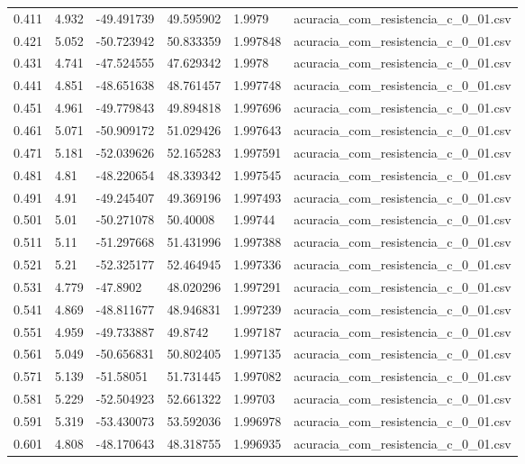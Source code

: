 \begin{table}
\begin{tabular}{llllll}
0.411 & 4.932 & -49.491739 & 49.595902 & 1.9979 & acuracia\_com\_resistencia\_c\_0\_01.csv \\
0.421 & 5.052 & -50.723942 & 50.833359 & 1.997848 & acuracia\_com\_resistencia\_c\_0\_01.csv \\
0.431 & 4.741 & -47.524555 & 47.629342 & 1.9978 & acuracia\_com\_resistencia\_c\_0\_01.csv \\
0.441 & 4.851 & -48.651638 & 48.761457 & 1.997748 & acuracia\_com\_resistencia\_c\_0\_01.csv \\
0.451 & 4.961 & -49.779843 & 49.894818 & 1.997696 & acuracia\_com\_resistencia\_c\_0\_01.csv \\
0.461 & 5.071 & -50.909172 & 51.029426 & 1.997643 & acuracia\_com\_resistencia\_c\_0\_01.csv \\
0.471 & 5.181 & -52.039626 & 52.165283 & 1.997591 & acuracia\_com\_resistencia\_c\_0\_01.csv \\
0.481 & 4.81 & -48.220654 & 48.339342 & 1.997545 & acuracia\_com\_resistencia\_c\_0\_01.csv \\
0.491 & 4.91 & -49.245407 & 49.369196 & 1.997493 & acuracia\_com\_resistencia\_c\_0\_01.csv \\
0.501 & 5.01 & -50.271078 & 50.40008 & 1.99744 & acuracia\_com\_resistencia\_c\_0\_01.csv \\
0.511 & 5.11 & -51.297668 & 51.431996 & 1.997388 & acuracia\_com\_resistencia\_c\_0\_01.csv \\
0.521 & 5.21 & -52.325177 & 52.464945 & 1.997336 & acuracia\_com\_resistencia\_c\_0\_01.csv \\
0.531 & 4.779 & -47.8902 & 48.020296 & 1.997291 & acuracia\_com\_resistencia\_c\_0\_01.csv \\
0.541 & 4.869 & -48.811677 & 48.946831 & 1.997239 & acuracia\_com\_resistencia\_c\_0\_01.csv \\
0.551 & 4.959 & -49.733887 & 49.8742 & 1.997187 & acuracia\_com\_resistencia\_c\_0\_01.csv \\
0.561 & 5.049 & -50.656831 & 50.802405 & 1.997135 & acuracia\_com\_resistencia\_c\_0\_01.csv \\
0.571 & 5.139 & -51.58051 & 51.731445 & 1.997082 & acuracia\_com\_resistencia\_c\_0\_01.csv \\
0.581 & 5.229 & -52.504923 & 52.661322 & 1.99703 & acuracia\_com\_resistencia\_c\_0\_01.csv \\
0.591 & 5.319 & -53.430073 & 53.592036 & 1.996978 & acuracia\_com\_resistencia\_c\_0\_01.csv \\
0.601 & 4.808 & -48.170643 & 48.318755 & 1.996935 & acuracia\_com\_resistencia\_c\_0\_01.csv \\

\end{tabular}
\end{table}
